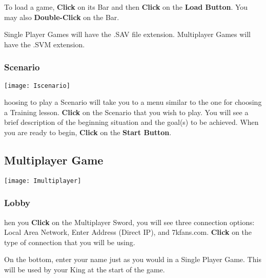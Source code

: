 
To load a game, \textbf{Click} on its Bar and then \textbf{Click} on the \textbf{Load Button}. You may also \textbf{Double-Click} on the Bar.


Single Player Games will have the .SAV file extension. Multiplayer Games will have the .SVM extension.

\subsubsection{\textsf{Scenario}}


\begin{center}
    \texttt{[image: Iscenario]} %
\end{center}

hoosing to play a Scenario will take you to a menu similar to the one for choosing a Training lesson. \textbf{Click} on the Scenario that you wish to play. You will see a brief description of the beginning situation and the goal(s) to be achieved. When you are ready to begin, \textbf{Click} on the \textbf{Start Button}.

\subsection{\textsf{Multiplayer Game}}



\begin{center}
    \texttt{[image: Imultiplayer]} %
\end{center}

\subsubsection{\textsf{Lobby}} %

hen you \textbf{Click} on the Multiplayer Sword, you will see three connection options: Local Area Network, Enter Address (Direct IP), and 7kfans.com. \textbf{Click} on the type of connection that you will be using.

On the bottom, enter your name just as you would in a Single Player Game. This will be used by your King at the start of the game.

